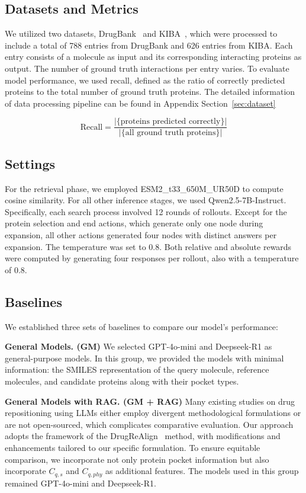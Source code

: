 \documentclass[letterpaper,twocolumn,10pt]{llncs}
\begin{document}
\subsection{Datasets and Metrics}
We utilized two datasets, DrugBank~\cite{knox2024drugbank} and KIBA~\cite{tang2014making}, which were processed to include a total of 788 entries from DrugBank and 626 entries from KIBA. Each entry consists of a molecule as input and its corresponding interacting proteins as output. The number of ground truth interactions per entry varies. To evaluate model performance, we used recall, defined as the ratio of correctly predicted proteins to the total number of ground truth proteins. The detailed information of data processing pipeline can be found in Appendix Section~\ref{sec:dataset}

\begin{equation}
\text{Recall} = \frac{|\{\text{proteins predicted correctly}\}|}{|\{\text{all ground truth proteins}\}|}
\end{equation}

\subsection{Settings}
For the retrieval phase, we employed ESM2\_t33\_650M\_UR50D to compute cosine similarity. For all other inference stages, we used Qwen2.5-7B-Instruct. Specifically, each search process involved 12 rounds of rollouts. Except for the protein selection and end actions, which generate only one node during expansion, all other actions generated four nodes with distinct answers per expansion. The temperature was set to 0.8. Both relative and absolute rewards were computed by generating four responses per rollout, also with a temperature of 0.8.

\subsection{Baselines}
We established three sets of baselines to compare our model's performance:

\textbf{General Models. (GM)}
We selected GPT-4o-mini and Deepseek-R1 as general-purpose models. In this group, we provided the models with minimal information: the SMILES representation of the query molecule, reference molecules, and candidate proteins along with their pocket types.

\textbf{General Models with RAG. (GM + RAG)}
Many existing studies on drug repositioning using LLMs either employ divergent methodological formulations or are not open-sourced, which complicates comparative evaluation. Our approach adopts the framework of the DrugReAlign~\cite{wei2024drugrealign} method, with modifications and enhancements tailored to our specific formulation. To ensure equitable comparison, we incorporate not only protein pocket information but also incorporate $C_{q,s}$ and $C_{q,phy}$ as additional features. The models used in this group remained GPT-4o-mini and Deepseek-R1.
\end{document}
